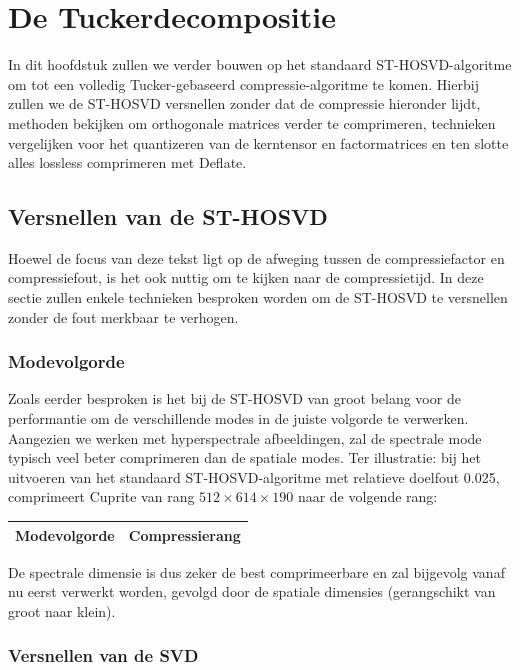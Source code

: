 \chapter{De Tuckerdecompositie}
\label{hoofdstuk:tucker}

In dit hoofdstuk zullen we verder bouwen op het standaard ST-HOSVD-algoritme om tot een volledig Tucker-gebaseerd compressie-algoritme te komen. Hierbij zullen we de ST-HOSVD versnellen zonder dat de compressie hieronder lijdt, methoden bekijken om orthogonale matrices verder te comprimeren, technieken vergelijken voor het quantizeren van de kerntensor en factormatrices en ten slotte alles lossless comprimeren met Deflate.

\section{Versnellen van de ST-HOSVD}

Hoewel de focus van deze tekst ligt op de afweging tussen de compressiefactor en compressiefout, is het ook nuttig om te kijken naar de compressietijd. In deze sectie zullen enkele technieken besproken worden om de ST-HOSVD te versnellen zonder de fout merkbaar te verhogen.

\subsection{Modevolgorde}

Zoals eerder besproken is het bij de ST-HOSVD van groot belang voor de performantie om de verschillende modes in de juiste volgorde te verwerken. Aangezien we werken met hyperspectrale afbeeldingen, zal de spectrale mode typisch veel beter comprimeren dan de spatiale modes. Ter illustratie: bij het uitvoeren van het standaard ST-HOSVD-algoritme met relatieve doelfout 0.025, comprimeert Cuprite van rang $512 \times 614 \times 190$ naar de volgende rang:
\begin{table}[H]
\centering
\begin{tabular}{|l|l|}
\hline
Modevolgorde & Compressierang \\ \hline

\end{tabular}
\end{table}
De spectrale dimensie is dus zeker de best comprimeerbare en zal bijgevolg vanaf nu eerst verwerkt worden, gevolgd door de spatiale dimensies (gerangschikt van groot naar klein).

\subsection{Versnellen van de SVD}

